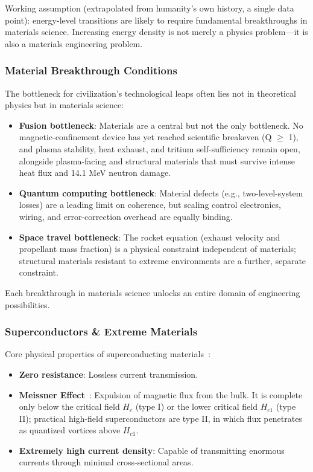 \documentclass[aps,prd,twocolumn,superscriptaddress,nofootinbib]{revtex4-2}
\begin{document}
Working assumption (extrapolated from humanity's own history, a single data point): energy-level transitions are likely to require fundamental breakthroughs in materials science. Increasing energy density is not merely a physics problem---it is also a materials engineering problem.

\subsubsection{Material Breakthrough Conditions}\label{sec:material-breakthroughs}

The bottleneck for civilization's technological leaps often lies not in theoretical physics but in materials science:

\begin{itemize}
  \item \textbf{Fusion bottleneck}: Materials are a central but not the only bottleneck. No magnetic-confinement device has yet reached scientific breakeven (Q $\geq$ 1), and plasma stability, heat exhaust, and tritium self-sufficiency remain open, alongside plasma-facing and structural materials that must survive intense heat flux and 14.1 MeV neutron damage.
  \item \textbf{Quantum computing bottleneck}: Material defects (e.g., two-level-system losses) are a leading limit on coherence, but scaling control electronics, wiring, and error-correction overhead are equally binding.
  \item \textbf{Space travel bottleneck}: The rocket equation (exhaust velocity and propellant mass fraction) is a physical constraint independent of materials; structural materials resistant to extreme environments are a further, separate constraint.
\end{itemize}

Each breakthrough in materials science unlocks an entire domain of engineering possibilities.

\subsubsection{Superconductors \& Extreme Materials}\label{sec:superconductors}

Core physical properties of superconducting materials~\cite{Bardeen1957}:

\begin{itemize}
  \item \textbf{Zero resistance}: Lossless current transmission.
  \item \textbf{Meissner Effect}~\cite{Meissner1933}: Expulsion of magnetic flux from the bulk. It is complete only below the critical field $H_{c}$ (type I) or the lower critical field $H_{c1}$ (type II); practical high-field superconductors are type II, in which flux penetrates as quantized vortices above $H_{c1}$.
  \item \textbf{Extremely high current density}: Capable of transmitting enormous currents through minimal cross-sectional areas.
\end{itemize}
\end{document}
